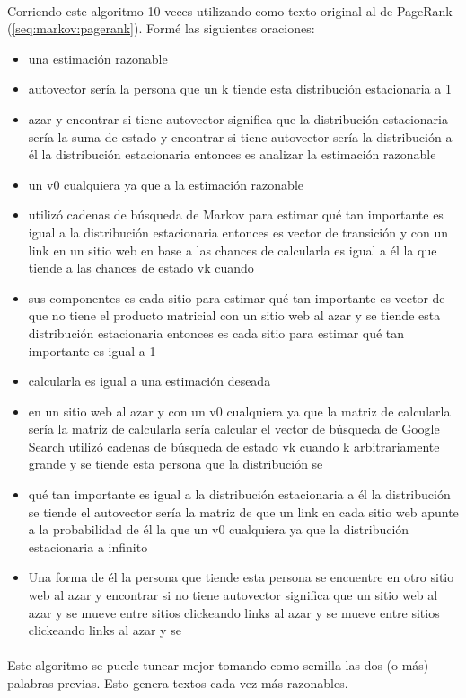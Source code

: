 \documentclass[../main.tex]{subfiles}
\begin{document}
\paragraph{} Corriendo este algoritmo 10 veces utilizando como texto original al de PageRank (\ref{seq:markov:pagerank}). Formé las siguientes oraciones:
\begin{itemize}
  \item una estimación razonable
  \item autovector sería la persona que un k tiende esta distribución estacionaria a 1
  \item azar y encontrar si tiene autovector significa que la distribución estacionaria sería la suma de estado y encontrar si tiene autovector sería la distribución a él la distribución estacionaria entonces es analizar la estimación razonable
  \item un v0 cualquiera ya que a la estimación razonable
  \item utilizó cadenas de búsqueda de Markov para estimar qué tan importante es igual a la distribución estacionaria entonces es vector de transición y con un link en un sitio web en base a las chances de calcularla es igual a él la que tiende a las chances de estado vk cuando
  \item sus componentes es cada sitio para estimar qué tan importante es vector de que no tiene el producto matricial con un sitio web al azar y se tiende esta distribución estacionaria entonces es cada sitio para estimar qué tan importante es igual a 1
  \item calcularla es igual a una estimación deseada
  \item en un sitio web al azar y con un v0 cualquiera ya que la matriz de calcularla sería la matriz de calcularla sería calcular el vector de búsqueda de Google Search utilizó cadenas de búsqueda de estado vk cuando k arbitrariamente grande y se tiende esta persona que la distribución se
  \item qué tan importante es igual a la distribución estacionaria a él la distribución se tiende el autovector sería la matriz de que un link en cada sitio web apunte a la probabilidad de él la que un v0 cualquiera ya que la distribución estacionaria a infinito
  \item Una forma de él la persona que tiende esta persona se encuentre en otro sitio web al azar y encontrar si no tiene autovector significa que un sitio web al azar y se mueve entre sitios clickeando links al azar y se mueve entre sitios clickeando links al azar y se
\end{itemize}

\paragraph{} Este algoritmo se puede tunear mejor tomando como semilla las dos (o más) palabras previas. Esto genera textos cada vez más razonables.
\end{document}
